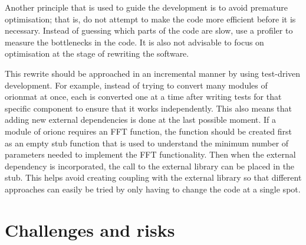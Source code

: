 Another principle that is used to guide the development is to
avoid premature optimisation; that is, do not attempt to make the
code more efficient before it is necessary. Instead of guessing
which parts of the code are slow, use a profiler to measure the
bottlenecks in the code. It is also not advisable to focus on
optimisation at the stage of rewriting the software.

This rewrite should be approached in an incremental manner by
using test-driven development. For example, instead of trying to convert many
modules of \gls{orionmat} at once, each is converted one at a
time after writing tests for that specific component to ensure
that it works independently. This also means that adding new
external dependencies is done at the last possible moment. If a
module of \gls{orionc} requires an \acrshort{FFT} function,
the function should be created first as an empty stub function
that is used to understand the minimum number of parameters needed
to implement the FFT functionality. Then when the external dependency
is incorporated, the call to the external library can be placed in
the stub. This helps avoid creating coupling with the external
library so that different approaches can easily be tried by only
having to change the code at a single spot.

\section{Challenges and risks}

